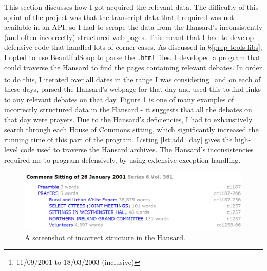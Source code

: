 \documentclass[12pt,a4paper,twoside,openright]{report}
\newcommand{\mylisting}[4]{}
\newcommand{\pylisting}[2]{\mylisting{Python}{py}{#1}{#2}}
\begin{document}
This section discusses how I got acquired the relevant data. The difficulty of this sprint of the project was that the transcript data that I required was not available in an API, so I had to scrape the data from the Hansard's inconsistently (and often incorrectly) structured web pages. This meant that I had to develop defensive code that handled lots of corner cases. As discussed in \S\ref{prep-tools-libs}, I opted to use BeautifulSoup to parse the \texttt{.html} files.
\newline
I developed a program that could traverse the Hansard to find the pages containing relevant debates. In order to do this, I iterated over all dates in the range I was considering\footnote{11/09/2001 to 18/03/2003 (inclusive)} and on each of these days, parsed the Hansard's webpage for that day and used this to find links to any relevant debates on that day. Figure \ref{fig:incorrecthansard} is one of many examples of incorrectly structured data in the Hansard - it suggests that all the debates on that day were prayers. Due to the Hansard's deficiencies, I had to exhaustively search through each House of Commons sitting, which significantly increased the running time of this part of the program. Listing \ref{lst:add_day} gives the high-level code used to traverse the Hansard archives. The Hansard's inconsistencies required me to program defensively, by using extensive exception-handling.
\newline

\begin{figure}
	\includegraphics[width=\linewidth]{figs/incorrecthansard.png}
	\caption{A screenshot of incorrect structure in the Hansard.}
	\label{fig:incorrecthansard}
\end{figure}

\pylisting{High-level code used to scrape all the debates from a given day.}{add_day}
\end{document}
